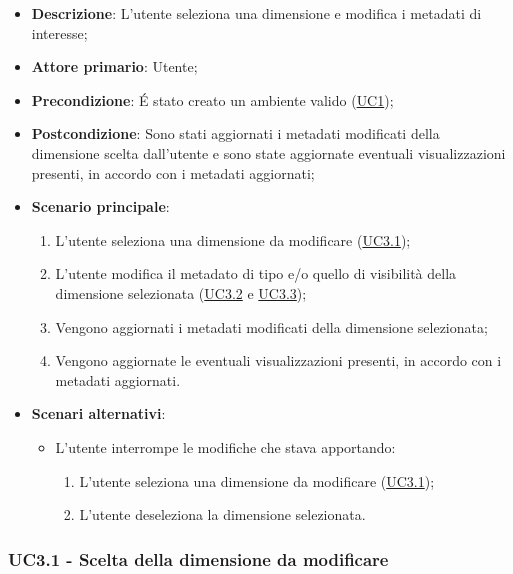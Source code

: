 \begin{itemize}
    \item \textbf{Descrizione}: L’utente seleziona una dimensione e modifica i metadati di interesse;
	
    \item \textbf{Attore primario}: Utente;
    
    \item \textbf{Precondizione}:   É stato creato un ambiente valido (\hyperref[sub:uc1]{UC1});
    \item \textbf{Postcondizione}:  Sono stati aggiornati i metadati modificati della dimensione scelta dall'utente e 
    sono state aggiornate eventuali visualizzazioni presenti, in accordo con i metadati aggiornati;

	\item \textbf{Scenario principale}:
        \begin{enumerate}
                \item L'utente seleziona una dimensione da modificare (\hyperref[ssub:uc3.1]{UC3.1});
                \item L'utente modifica il metadato di tipo e/o quello di visibilità della dimensione selezionata 
                (\hyperref[ssub:uc3.2]{UC3.2} e \hyperref[ssub:uc3.3]{UC3.3});
                \item Vengono aggiornati i metadati modificati della dimensione selezionata;
                \item Vengono aggiornate le eventuali visualizzazioni presenti, in accordo con i metadati 
                aggiornati.
        \end{enumerate}

    \item \textbf{Scenari alternativi}:
    \begin{itemize}
        \item L'utente interrompe le modifiche che stava apportando:
        \begin{enumerate}
            \item L'utente seleziona una dimensione da modificare (\hyperref[ssub:uc3.1]{UC3.1});
            \item L'utente deseleziona la dimensione selezionata.
        \end{enumerate}
    \end{itemize}
\end{itemize}

\newpage

\subsubsection{UC3.1 - Scelta della dimensione da modificare}
\label{ssub:uc3.1}

